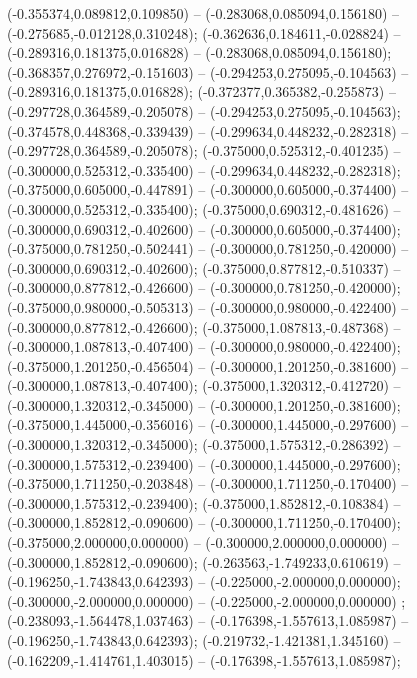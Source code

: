  (-0.355374,0.089812,0.109850) -- (-0.283068,0.085094,0.156180) -- (-0.275685,-0.012128,0.310248);
 (-0.362636,0.184611,-0.028824) -- (-0.289316,0.181375,0.016828) -- (-0.283068,0.085094,0.156180);
 (-0.368357,0.276972,-0.151603) -- (-0.294253,0.275095,-0.104563) -- (-0.289316,0.181375,0.016828);
 (-0.372377,0.365382,-0.255873) -- (-0.297728,0.364589,-0.205078) -- (-0.294253,0.275095,-0.104563);
 (-0.374578,0.448368,-0.339439) -- (-0.299634,0.448232,-0.282318) -- (-0.297728,0.364589,-0.205078);
 (-0.375000,0.525312,-0.401235) -- (-0.300000,0.525312,-0.335400) -- (-0.299634,0.448232,-0.282318);
 (-0.375000,0.605000,-0.447891) -- (-0.300000,0.605000,-0.374400) -- (-0.300000,0.525312,-0.335400);
 (-0.375000,0.690312,-0.481626) -- (-0.300000,0.690312,-0.402600) -- (-0.300000,0.605000,-0.374400);
 (-0.375000,0.781250,-0.502441) -- (-0.300000,0.781250,-0.420000) -- (-0.300000,0.690312,-0.402600);
 (-0.375000,0.877812,-0.510337) -- (-0.300000,0.877812,-0.426600) -- (-0.300000,0.781250,-0.420000);
 (-0.375000,0.980000,-0.505313) -- (-0.300000,0.980000,-0.422400) -- (-0.300000,0.877812,-0.426600);
 (-0.375000,1.087813,-0.487368) -- (-0.300000,1.087813,-0.407400) -- (-0.300000,0.980000,-0.422400);
 (-0.375000,1.201250,-0.456504) -- (-0.300000,1.201250,-0.381600) -- (-0.300000,1.087813,-0.407400);
 (-0.375000,1.320312,-0.412720) -- (-0.300000,1.320312,-0.345000) -- (-0.300000,1.201250,-0.381600);
 (-0.375000,1.445000,-0.356016) -- (-0.300000,1.445000,-0.297600) -- (-0.300000,1.320312,-0.345000);
 (-0.375000,1.575312,-0.286392) -- (-0.300000,1.575312,-0.239400) -- (-0.300000,1.445000,-0.297600);
 (-0.375000,1.711250,-0.203848) -- (-0.300000,1.711250,-0.170400) -- (-0.300000,1.575312,-0.239400);
 (-0.375000,1.852812,-0.108384) -- (-0.300000,1.852812,-0.090600) -- (-0.300000,1.711250,-0.170400);
 (-0.375000,2.000000,0.000000) -- (-0.300000,2.000000,0.000000) -- (-0.300000,1.852812,-0.090600);
 (-0.263563,-1.749233,0.610619) -- (-0.196250,-1.743843,0.642393) -- (-0.225000,-2.000000,0.000000);
 (-0.300000,-2.000000,0.000000) -- (-0.225000,-2.000000,0.000000) ;
 (-0.238093,-1.564478,1.037463) -- (-0.176398,-1.557613,1.085987) -- (-0.196250,-1.743843,0.642393);
 (-0.219732,-1.421381,1.345160) -- (-0.162209,-1.414761,1.403015) -- (-0.176398,-1.557613,1.085987);
